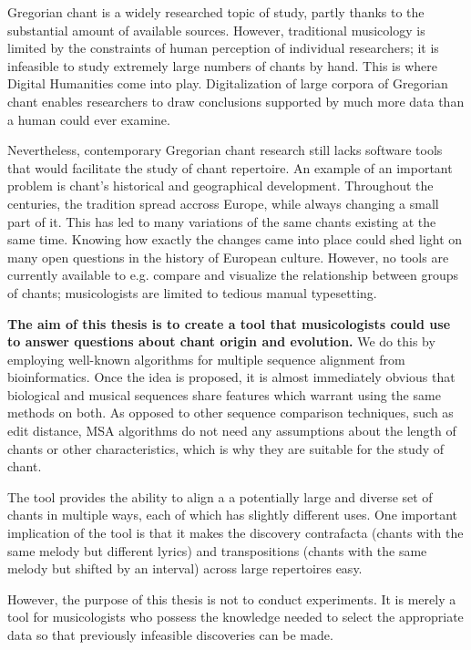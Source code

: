 Gregorian chant is a widely researched topic of study, partly thanks to the substantial amount of available sources. However, traditional
musicology is limited by the constraints of human perception of individual researchers; it is infeasible to study extremely large numbers of chants by hand. This is where
Digital Humanities come into play. Digitalization of large corpora of Gregorian chant enables researchers to draw conclusions
supported by much more data than a human could ever examine.

Nevertheless, contemporary Gregorian chant research still lacks software tools that would facilitate the study of chant repertoire. An example
of an important problem is chant's historical and geographical development. Throughout the 
centuries, the tradition spread accross Europe, while always changing a small part of it. This has led to many variations of the same
chants existing at the same time. Knowing how exactly the changes came into place could shed light on many open questions in the history of 
European culture. However, no tools are currently available to e.g. compare and visualize the relationship between groups of chants; musicologists
are limited to tedious manual typesetting.

\textbf{The aim of this thesis is to create a tool that musicologists could use to answer questions about chant origin and evolution.} We do this by employing
well-known algorithms for multiple sequence alignment from bioinformatics. Once the idea is proposed, it is almost immediately obvious that
biological and musical sequences share features which warrant using the same methods on both. As opposed to other sequence comparison techniques, such as edit
distance, MSA algorithms do not need any assumptions about the length of chants or other characteristics, which is why they are suitable
for the study of chant.


The tool provides the ability to align a a potentially large and diverse set of chants in multiple ways, each of which has slightly different uses. One important
implication of the tool is that it makes the discovery contrafacta (chants with the same melody but different lyrics) and transpositions
(chants with the same melody but shifted by an interval) across large repertoires easy.

However, the purpose of this thesis is not to conduct experiments. It is merely a tool for musicologists who possess
the knowledge needed to select the appropriate data so that previously infeasible discoveries can be made.

